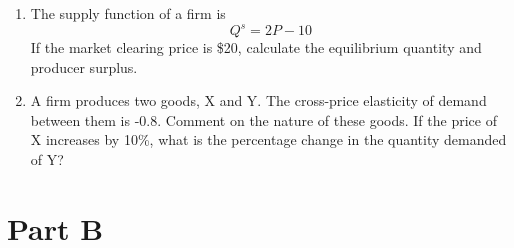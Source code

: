 \documentclass{article}
\begin{document}
\begin{enumerate}
        A firm produces in perfectly competitive market where the price is \$10. If the firm's cost function is given by
        \[
        C=(Q+3)^2
        \]
        Find the profit maximizing quantity.
    \item
        The supply function of a firm is 
        \[
        Q^s = 2P-10
        \]
        If the market clearing price is \$20, calculate the equilibrium quantity and producer surplus. 
    \item 
        A firm produces two goods, X and Y. The cross-price elasticity of demand between them is -0.8. Comment on the nature of these goods. If the price of X increases by 10\%, what is the percentage change in the quantity demanded of Y?
\end{enumerate} 

\section*{Part B}
\end{document}
